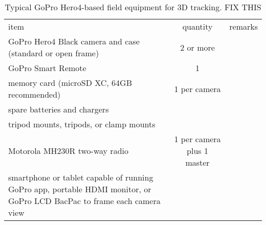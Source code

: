 \documentclass[fleqn,10pt]{wlpeerj}
\begin{document}
\begin{table}
\caption{Typical GoPro Hero4-based field equipment for 3D tracking. FIX THIS}
\label{table:goodies}
\begin{center}
\begin{tabular}{lcl}
item & quantity & remarks \\
GoPro Hero4 Black camera and case (standard or open frame) & 2 or more & \\
GoPro Smart Remote & 1 & \\
memory card (microSD XC, 64GB recommended) & 1 per camera & \\
spare batteries and chargers & & \\
tripod mounts, tripods, or clamp mounts & & \\ 
Motorola MH230R two-way radio & 1 per camera plus 1 master & \\
smartphone or tablet capable of running GoPro app, portable HDMI monitor, or GoPro LCD BacPac to frame each camera view & & \\
\end{tabular}
\end{center}
\end{table}
\end{document}
